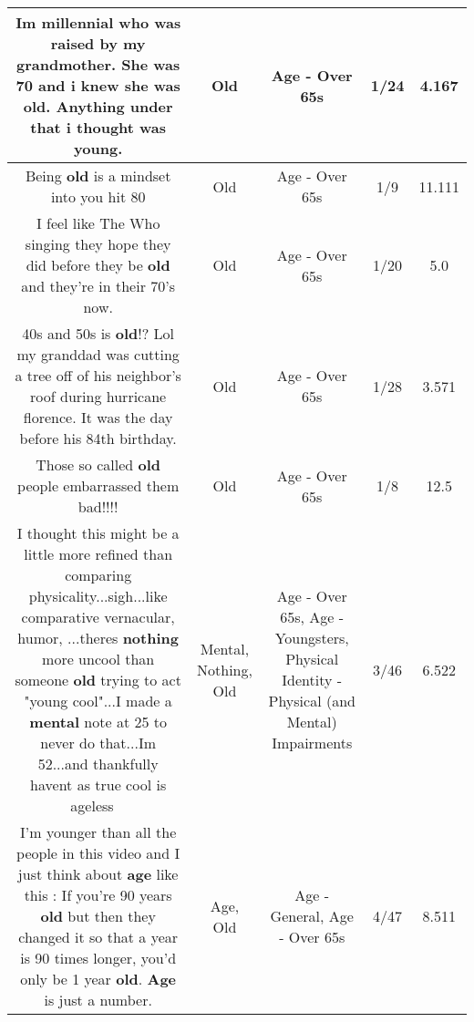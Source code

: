 \documentclass[11pt]{article}
\newlength\mylength
\begin{document}
\begin{center}
\begin{longtable}{|C{.65\mylength}|C{.30\mylength}|C{.12\mylength}|C{.12\mylength}|C{.12\mylength}|}
  \small Im millennial who was raised by my grandmother. She was 70 and i knew she was \textbf{old}. Anything under that i thought was young.\normalsize   & Old & Age - Over 65s & 1/24 & 4.167 \\  \hline
  \small Being \textbf{old} is a mindset into you hit 80\normalsize   & Old & Age - Over 65s & 1/9 & 11.111 \\  \hline
  \small I feel like The Who singing they hope they did before they be \textbf{old} and they're in their 70's now.\normalsize   & Old & Age - Over 65s & 1/20 & 5.0 \\  \hline
  \small 40s and 50s is \textbf{old}!? Lol my granddad was cutting a tree off of his neighbor's roof during hurricane florence. It was the day before his 84th birthday.\normalsize   & Old & Age - Over 65s & 1/28 & 3.571 \\  \hline
  \small Those so called \textbf{old} people embarrassed them bad!!!!\normalsize   & Old & Age - Over 65s & 1/8 & 12.5 \\  \hline
  \small I thought this might be a little more refined than comparing physicality...sigh...like comparative vernacular, humor, ...theres \textbf{nothing} more uncool than someone \textbf{old} trying to act "young cool"...I made a \textbf{mental} note at 25 to never do that...Im 52...and thankfully havent as true cool is ageless ~\normalsize   & Mental, Nothing, Old & Age - Over 65s, Age - Youngsters, Physical Identity - Physical (and Mental) Impairments & 3/46 & 6.522 \\  \hline
  \small I'm younger than all the people in this video and I just think about \textbf{age} like this : If you're 90 years \textbf{old} but then they changed it so that a year is 90 times longer, you'd only be 1 year \textbf{old}. \textbf{Age} is just a number.\normalsize   & Age, Old & Age - General, Age - Over 65s & 4/47 & 8.511 \\  \hline

\end{longtable}
\end{center}
\end{document}
